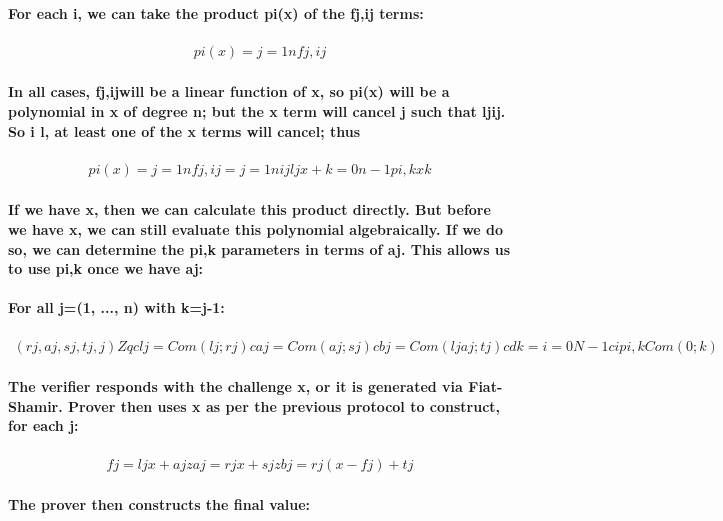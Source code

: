 \documentclass{article}
\begin{document}
\paragraph{For each i, we can take the product pi(x) of the fj,ij terms:}

\begin{eqnarray}
  pi(x)=j=1nfj,ij
\end{eqnarray}

\paragraph{In all cases, fj,ijwill be a linear function of x, so pi(x) will be a polynomial in x  of degree n; but the x term will cancel  j such that ljij.  So  i l, at least one of the x terms will cancel; thus}

\begin{eqnarray}
  pi(x)=j=1nfj,ij=j=1nijljx+ k=0n-1pi,k xk
\end{eqnarray}

\paragraph{If we have x, then we can calculate this product directly.  But before we have x, we can still evaluate this polynomial algebraically.  If we do so, we can determine the pi,k parameters in terms of aj.  This allows us to use pi,k once we have aj:}

\paragraph{For all j=(1, ..., n) with k=j-1:}

\begin{eqnarray}
  (rj,aj,sj,tj,j) Zq
  clj=Com(lj;rj)
  caj=Com(aj;sj)
  cbj=Com(ljaj;tj)
  cdk=i=0N-1cipi,k Com(0;k)
\end{eqnarray}

\paragraph{The verifier responds with the challenge x, or it is generated via Fiat-Shamir.  Prover then uses x as per the previous protocol to construct, for each j:}

\begin{eqnarray}
  fj=ljx+aj
  zaj=rjx+sj
  zbj=rj(x-fj)+tj
\end{eqnarray}

\paragraph{The prover then constructs the final value:}
\end{document}
